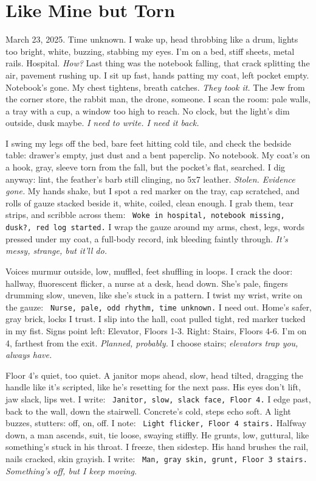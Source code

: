 \documentclass[12pt]{article} %
\newcommand{\note}[1]{\texttt{\small \color{DarkGray} #1}}
\begin{document}
\section{Like Mine but Torn}

March 23, 2025. Time unknown. I wake up, head throbbing like a drum, lights too bright, white, buzzing, stabbing my eyes. I’m on a bed, stiff sheets, metal rails. Hospital. \textit{How?} Last thing was the notebook falling, that crack splitting the air, pavement rushing up. I sit up fast, hands patting my coat, left pocket empty. Notebook’s gone. My chest tightens, breath catches. \textit{They took it.} The Jew from the corner store, the rabbit man, the drone, someone. I scan the room: pale walls, a tray with a cup, a window too high to reach. No clock, but the light’s dim outside, dusk maybe. \textit{I need to write. I need it back.}

I swing my legs off the bed, bare feet hitting cold tile, and check the bedside table: drawer’s empty, just dust and a bent paperclip. No notebook. My coat’s on a hook, gray, sleeve torn from the fall, but the pocket’s flat, searched. I dig anyway: lint, the feather’s barb still clinging, no 5x7 leather. \textit{Stolen. Evidence gone.} My hands shake, but I spot a red marker on the tray, cap scratched, and rolls of gauze stacked beside it, white, coiled, clean enough. I grab them, tear strips, and scribble across them: \note{Woke in hospital, notebook missing, dusk?, red log started.} I wrap the gauze around my arms, chest, legs, words pressed under my coat, a full-body record, ink bleeding faintly through. \textit{It’s messy, strange, but it’ll do.}

Voices murmur outside, low, muffled, feet shuffling in loops. I crack the door: hallway, fluorescent flicker, a nurse at a desk, head down. She’s pale, fingers drumming slow, uneven, like she’s stuck in a pattern. I twist my wrist, write on the gauze: \note{Nurse, pale, odd rhythm, time unknown.} I need out. Home’s safer, gray brick, locks I trust. I slip into the hall, coat pulled tight, red marker tucked in my fist. Signs point left: Elevator, Floors 1-3. Right: Stairs, Floors 4-6. I’m on 4, farthest from the exit. \textit{Planned, probably.} I choose stairs; \textit{elevators trap you, always have.}

Floor 4’s quiet, too quiet. A janitor mops ahead, slow, head tilted, dragging the handle like it’s scripted, like he’s resetting for the next pass. His eyes don’t lift, jaw slack, lips wet. I write: \note{Janitor, slow, slack face, Floor 4.} I edge past, back to the wall, down the stairwell. Concrete’s cold, steps echo soft. A light buzzes, stutters: off, on, off. I note: \note{Light flicker, Floor 4 stairs.} Halfway down, a man ascends, suit, tie loose, swaying stiffly. He grunts, low, guttural, like something’s stuck in his throat. I freeze, then sidestep. His hand brushes the rail, nails cracked, skin grayish. I write: \note{Man, gray skin, grunt, Floor 3 stairs.} \textit{Something’s off, but I keep moving.}
\end{document}
